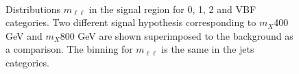 \begin{figure}[htbp]
\centering
{}
\\
\caption{Distributions  $m_{\ell \ell}$ in the signal region for 0, 1, 2 and VBF categories. Two different signal hypothesis corresponding to $m_X $400 GeV and $m_X $800 GeV are shown superimposed to the background as a comparison. The binning for $m_{\ell \ell}$ is the same in the jets categories.}
    \label{fig:mll_sigOF}
\end{figure}


